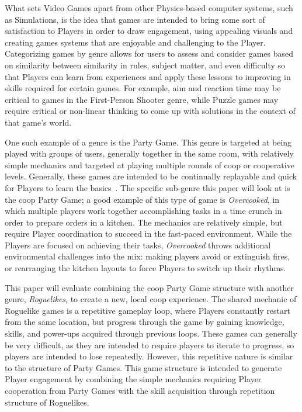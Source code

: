 What sets Video Games apart from other Physics-based computer systems, such as Simulations, is the idea that games are intended to bring some sort of satisfaction to Players in order to draw engagement, using appealing visuals and creating games systems that are enjoyable and challenging to the Player. Categorizing games by genre allows for users to assess and consider games based on similarity between similarity in rules, subject matter, and even difficulty so that Players can learn from experiences and apply these lessons to improving in skills required for certain games. For example, aim and reaction time may be critical to games in the First-Person Shooter genre, while Puzzle games may require critical or non-linear thinking to come up with solutions in the context of that game's world.

One such example of a genre is the Party Game. This genre is targeted at being played with groups of users, generally together in the same room, with relatively simple mechanics and targeted at playing multiple rounds of \ac{coop} or cooperative levels. Generally, these games are intended to be continually replayable and quick for Players to learn the basics~\cite{b4}. The specific sub-genre this paper will look at is the \ac{coop} Party Game; a good example of this type of game is \textit{Overcooked}, in which multiple players work together accomplishing tasks in a time crunch in order to prepare orders in a kitchen. The mechanics are relatively simple, but require Player coordination to succeed in the fast-paced environment. While the Players are focused on achieving their tasks, \textit{Overcooked} throws additional environmental challenges into the mix: making players avoid or extinguish fires, or rearranging the kitchen layouts to force Players to switch up their rhythms.

This paper will evaluate combining the \ac{coop} Party Game structure with another genre, \textit{Roguelikes}, to create a new, local \ac{coop} experience. The shared mechanic of Roguelike games is a repetitive gameplay loop, where Players constantly restart from the same location, but progress through the game by gaining knowledge, skills, and power-ups acquired through previous loops. These games can generally be very difficult, as they are intended to require players to iterate to progress, so players are intended to lose repeatedly. However, this repetitive nature is similar to the structure of Party Games. This game structure is intended to generate Player engagement by combining the simple mechanics requiring Player cooperation from Party Games with the skill acquisition through repetition structure of Roguelikes.
